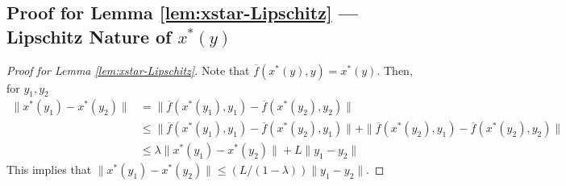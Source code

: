 \documentclass[letterpaper, 10 pt, conference]{ieeeconf}  %
\theoremstyle{definition}
\theoremstyle{plain}
\newcommand{\barf}{\overline{f}}
\newcommand{\xstar}{x^*}
\begin{document}
\subsection{\textbf{Proof for Lemma \ref{lem:xstar-Lipschitz} --- Lipschitz Nature of $\xstar(y)$}}
\begin{proof}[Proof for Lemma \ref{lem:xstar-Lipschitz}]
    Note that $\barf(\xstar(y),y)=\xstar(y)$. Then, for $y_1,y_2$
\begin{align*}
    \|\xstar(y_1)-\xstar(y_2)\|&=\|\barf(\xstar(y_1),y_1)-\barf(\xstar(y_2),y_2)\|\\
    &\leq \|\barf(\xstar(y_1),y_1)-\barf(\xstar(y_2),y_1)\|+ \|\barf(\xstar(y_2),y_1)-\barf(\xstar(y_2),y_2)\|\\
    &\leq \lambda\|\xstar(y_1)-\xstar(y_2)\|+L\|y_1-y_2\|
\end{align*}
This implies that $\|\xstar(y_1)-\xstar(y_2)\|\leq (L/(1-\lambda))\|y_1-y_2\|. $
\end{proof}
\end{document}
